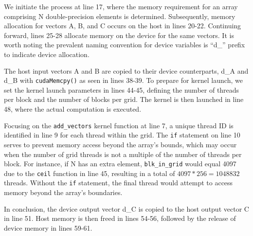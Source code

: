 

\addvspace{5cm}

We initiate the process at line 17, where the memory requirement for an array comprising N double-precision elements is 
determined. Subsequently, memory allocation for vectors A, B, and C occurs on the host in lines 20-22. Continuing forward, 
lines 25-28 allocate memory on the device for the same vectors. It is worth noting the prevalent naming convention for device 
variables is ``d\_'' prefix to indicate device allocation.

The host input vectors A and B are copied to their device counterparts, d\_A and d\_B with \texttt{cudaMemcpy()} 
as seen in lines 38-39. To prepare for kernel 
launch, we set the kernel launch parameters in lines 44-45, defining the number of threads per block and the number of 
blocks per grid. The kernel is then launched in line 48, where the actual computation is executed.

Focusing on the \texttt{add_vectors} kernel function at line 7, a unique thread ID is identified in line 9 
for each thread within 
the grid. The \texttt{if} statement on line 10 serves to prevent memory access beyond the array's bounds, 
which may occur when 
the number of grid threads is not a multiple of the number of threads per block. For instance, if N has an extra element, 
\texttt{blk_in_grid} would equal 4097 due to the \texttt{ceil} function in line 45, resulting in a total of 
$4097*256 = 1048832$ threads. 
Without the \texttt{if} statement, the final thread would attempt to access memory beyond the array's boundaries.

In conclusion, the device output vector d\_C is copied to the host output vector C in line 51. Host memory is then freed 
in lines 54-56, followed by the release of device memory in lines 59-61.

